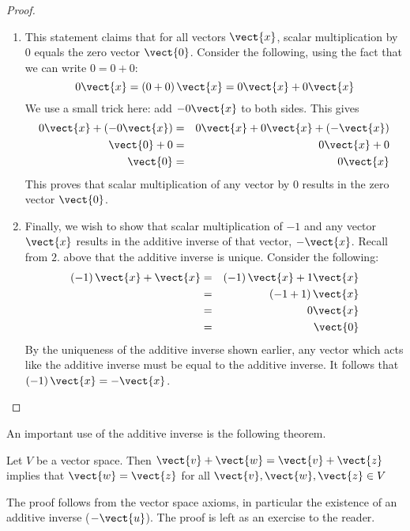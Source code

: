 \begin{proof}
\begin{enumerate}
\item
This statement claims that for all vectors $\vect{x}$, scalar multiplication by $0$ equals the zero vector $\vect{0}$. Consider the following, using the fact that we can write $0=0+0$:
\begin{equation*}
0\vect{x}=\left( 0+0\right) \vect{x}=0\vect{x}+0\vect{x}
\end{equation*}
We use a small trick here: add $-0\vect{x}$ to both sides. This gives 
\begin{eqnarray*}
0\vect{x} + (-0\vect{x})&=&0\vect{x}+0\vect{x}+(-\vect{x})\\
\vect{0} + 0 &=&0\vect{x} + 0 \\
\vect{0} &=& 0\vect{x}
\end{eqnarray*}
This proves that scalar multiplication of any vector by $0$ results in the zero vector $\vect{0}$. 

\item
Finally, we wish to show that scalar multiplication of $-1$ and any vector $\vect{x}$ results in the additive inverse of that vector, $-\vect{x}$. Recall from $2.$ above that the additive inverse is unique. 
Consider the following: 
\begin{eqnarray*}
\left( -1\right) \vect{x}+\vect{x} & =&\left( -1\right) \vect{x}+1\vect{x}\\
&=&\left(-1+1\right) \vect{x} \\
&=&0\vect{x} \\
&=&\vect{0}
\end{eqnarray*}
By the uniqueness of the additive inverse shown earlier, any vector which acts like the additive inverse must be equal to the additive inverse. It follows that $\left( -1\right) 
\vect{x}=-\vect{x}$.
\end{enumerate}
\end{proof}

An important use of the additive inverse is the following theorem.

\begin{theorem}{}{}
Let $V$ be a vector space. Then $\vect{v} + \vect{w} = \vect{v} + \vect{z}$ implies that $\vect{w} = \vect{z}$ for all $\vect{v}, \vect{w}, \vect{z} \in V$
\end{theorem}

The proof follows from the vector space axioms, in particular the existence of an additive inverse ($-\vect{u}$). The proof is left as an exercise to the reader. 